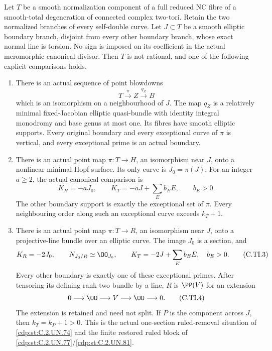 
\begin{proposition}\label{cdp:st:C.2.UN.83}
Let \(T\) be a smooth normalization component of a full
reduced NC fibre of a smooth-total degeneration of connected
complex two-tori. Retain the two normalized branches of
every self-double curve. Let \(J\subset T\) be a smooth
elliptic boundary branch, disjoint from every other boundary
branch, whose exact normal line is torsion. No sign is
imposed on its coefficient in the actual meromorphic
canonical divisor. Then \(T\) is not rational, and one
of the following explicit comparisons holds.

\begin{enumerate}
\item There is an actual sequence of point blowdowns
\[
 T\xrightarrow{\pi}Z\xrightarrow{q_Z}B
 \tag{C.TI.1}\label{cdp:eq:C.TI.1}
\]
which is an isomorphism on a neighbourhood of \(J\).
The map \(q_Z\) is a relatively minimal fixed-Jacobian
elliptic quasi-bundle with identity integral monodromy
and base genus at most one. Its fibres have smooth
elliptic supports. Every original boundary and every
exceptional curve of \(\pi\) is vertical, and every
exceptional prime is an actual boundary.

\item There is an actual point map \(\pi:T\to H\),
an isomorphism near \(J\), onto a nonlinear minimal
Hopf surface. Its only curve is \(J_0=\pi(J)\).
For an integer \(a\ge2\), the actual canonical
comparison is
\[
 K_H=-aJ_0,\qquad
 K_T=-aJ+\sum_E b_EE,\qquad b_E>0.
 \tag{C.TI.2}\label{cdp:eq:C.TI.2}
\]
The other boundary support is exactly the exceptional
set of \(\pi\). Every neighbouring order along such
an exceptional curve exceeds \(k_T+1\).

\item There is an actual point map \(\pi:T\to R\),
an isomorphism near \(J\), onto a projective-line
bundle over an elliptic curve. The image \(J_0\)
is a section, and
\[
 K_R=-2J_0,\qquad N_{J_0/R}\simeq\OO_{J_0},\qquad
 K_T=-2J+\sum_E b_EE,\quad b_E>0.
 \tag{C.TI.3}\label{cdp:eq:C.TI.3}
\]
Every other boundary is exactly one of these
exceptional primes. After tensoring its defining
rank-two bundle by a line, \(R\) is
\(\PP(V)\) for an extension
\[
              0\longrightarrow\OO\longrightarrow V
                    \longrightarrow\OO\longrightarrow0.
 \tag{C.TI.4}\label{cdp:eq:C.TI.4}
\]
The extension is retained and need not split.
If \(P\) is the component across \(J\), then
\(k_T=k_P+1>0\). This is the actual one-section
ruled-removal situation of \ref{cdp:st:C.2.UN.74} and the finite
restored ruled block of \ref{cdp:st:C.2.UN.77}/\ref{cdp:st:C.2.UN.81}.
\end{enumerate}


\end{proposition}
